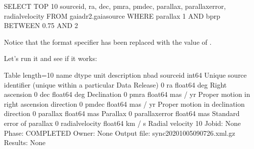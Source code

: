 \documentclass[letterpaper,10pt,english]{sphinxmanual}
\begin{document}
\begin{sphinxVerbatim}[commandchars=\\\{\}]
SELECT TOP 10 
source\PYGZus{}id, ra, dec, pmra, pmdec, parallax, parallax\PYGZus{}error, radial\PYGZus{}velocity
FROM gaiadr2.gaia\PYGZus{}source
WHERE parallax \PYGZlt{} 1
  AND bp\PYGZus{}rp BETWEEN \PYGZhy{}0.75 AND 2
\end{sphinxVerbatim}

Notice that the format specifier has been replaced with the value of .

Let’s run it and see if it works:

\begin{sphinxVerbatim}[commandchars=\\\{\}]
  
\end{sphinxVerbatim}

\begin{sphinxVerbatim}[commandchars=\\\{\}]
\PYGZlt{}Table length=10\PYGZgt{}
      name       dtype    unit                              description                             n\PYGZus{}bad
\PYGZhy{}\PYGZhy{}\PYGZhy{}\PYGZhy{}\PYGZhy{}\PYGZhy{}\PYGZhy{}\PYGZhy{}\PYGZhy{}\PYGZhy{}\PYGZhy{}\PYGZhy{}\PYGZhy{}\PYGZhy{}\PYGZhy{} \PYGZhy{}\PYGZhy{}\PYGZhy{}\PYGZhy{}\PYGZhy{}\PYGZhy{}\PYGZhy{} \PYGZhy{}\PYGZhy{}\PYGZhy{}\PYGZhy{}\PYGZhy{}\PYGZhy{}\PYGZhy{}\PYGZhy{} \PYGZhy{}\PYGZhy{}\PYGZhy{}\PYGZhy{}\PYGZhy{}\PYGZhy{}\PYGZhy{}\PYGZhy{}\PYGZhy{}\PYGZhy{}\PYGZhy{}\PYGZhy{}\PYGZhy{}\PYGZhy{}\PYGZhy{}\PYGZhy{}\PYGZhy{}\PYGZhy{}\PYGZhy{}\PYGZhy{}\PYGZhy{}\PYGZhy{}\PYGZhy{}\PYGZhy{}\PYGZhy{}\PYGZhy{}\PYGZhy{}\PYGZhy{}\PYGZhy{}\PYGZhy{}\PYGZhy{}\PYGZhy{}\PYGZhy{}\PYGZhy{}\PYGZhy{}\PYGZhy{}\PYGZhy{}\PYGZhy{}\PYGZhy{}\PYGZhy{}\PYGZhy{}\PYGZhy{}\PYGZhy{}\PYGZhy{}\PYGZhy{}\PYGZhy{}\PYGZhy{}\PYGZhy{}\PYGZhy{}\PYGZhy{}\PYGZhy{}\PYGZhy{}\PYGZhy{}\PYGZhy{}\PYGZhy{}\PYGZhy{}\PYGZhy{}\PYGZhy{}\PYGZhy{}\PYGZhy{}\PYGZhy{}\PYGZhy{}\PYGZhy{}\PYGZhy{}\PYGZhy{}\PYGZhy{} \PYGZhy{}\PYGZhy{}\PYGZhy{}\PYGZhy{}\PYGZhy{}
      source\PYGZus{}id   int64          Unique source identifier (unique within a particular Data Release)     0
             ra float64      deg                                                    Right ascension     0
            dec float64      deg                                                        Declination     0
           pmra float64 mas / yr                         Proper motion in right ascension direction     0
          pmdec float64 mas / yr                             Proper motion in declination direction     0
       parallax float64      mas                                                           Parallax     0
 parallax\PYGZus{}error float64      mas                                         Standard error of parallax     0
radial\PYGZus{}velocity float64   km / s                                                    Radial velocity    10
Jobid: None
Phase: COMPLETED
Owner: None
Output file: sync\PYGZus{}20201005090726.xml.gz
Results: None
\end{sphinxVerbatim}
\end{document}
